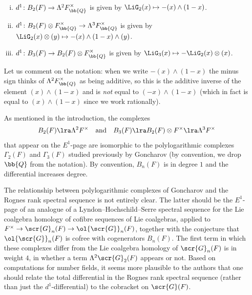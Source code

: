 \documentclass[a4paper]{amsart}
\begin{document}
\begin{corollary} \label{cor computation of d^1}\,
    \begin{enumerate}[(i)]
        \item $d^1 \colon B_2(F) \to \Lambda^2 F^\times_\bb{Q}$ is given by $\LiG_2(x) \mapsto -(x) \wedge (1-x)$.
        \item $d^1 \colon B_2(F) \otimes F^\times_\bb{Q} \to \Lambda^3 F^\times_\bb{Q}$ is given by $\LiG_2(x) \otimes (y) \mapsto -(x) \wedge (1-x) \wedge (y)$.
        \item $d^1 \colon B_3(F) \to B_2(F) \otimes F^\times_\bb{Q}$ is given by $\LiG_3(x) \mapsto -\LiG_2(x) \otimes (x)$.
    \end{enumerate}
\end{corollary}

\begin{remark}Let us comment on the notation: when we write $-(x) \wedge (1-x)$ the minus sign thinks of $\Lambda^2 F^\times_\bb{Q}$ as being additive, so this is the additive inverse of the element $(x) \wedge (1-x)$ and is \emph{not} equal to $(-x) \wedge (1-x)$ (which in fact is equal to $(x) \wedge (1-x)$ since we work rationally).\end{remark}

As mentioned in the introduction, the complexes
\[B_2(F) \lra \Lambda^2 F^\times \quad \text{and} \quad B_3(F) \lra B_2(F) \otimes F^\times \lra \Lambda^3 F^\times\]
that appear on the $E^1$-page are isomorphic to the polylogarithmic complexes $\Gamma_2(F)$ and $\Gamma_3(F)$ studied previously by Goncharov \cite{Gon95b} (by convention, we drop $\bb{Q}$ from the notation). By convention, $B_n(F)$ is in degree $1$ and the differential increases degree.

\begin{remark}The relationship between polylogarithmic complexes of Goncharov and the Rognes rank spectral sequence is not entirely clear. The latter should be the $E^1$-page of an analogue of a Lyndon--Hochschild--Serre spectral sequence for the Lie coalgebra homology of cofibre sequences of Lie coalgebras, applied to $F^\times \to \scr{G}_n(F) \to \ol{\scr{G}}_n(F)$, together with the conjecture that $\ol{\scr{G}}_n(F)$ is cofree with cogenerators $B_n(F)$. The first term in which these complexes differ from the Lie coalgebra homology of $\scr{G}_n(F)$ is in weight $4$, in whether a term $\Lambda^2 \scr{G}_2(F)$ appears or not. Based on computations for number fields, it seems more plausible to the authors that one should relate the total differential in the Rognes rank spectral sequence (rather than just the $d^1$-differential) to the cobracket on $\scr{G}(F)$.
\end{remark}
\end{document}
